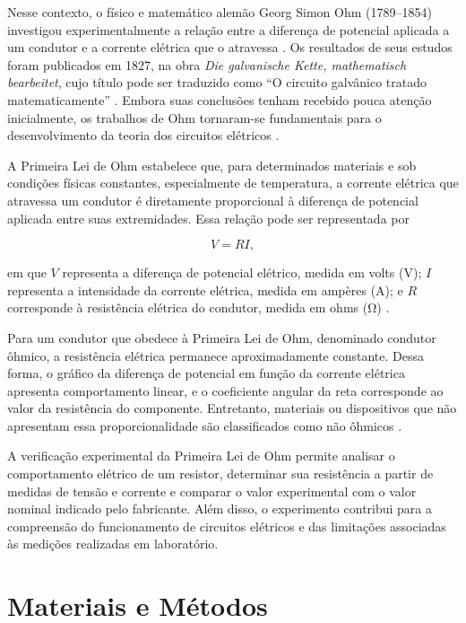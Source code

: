 \documentclass[a4paper,12pt]{article}
\begin{document}
Nesse contexto, o físico e matemático alemão Georg Simon Ohm (1789--1854) investigou experimentalmente a relação entre a diferença de potencial aplicada a um condutor e a corrente elétrica que o atravessa \parencite{mactutor_ohm}. Os resultados de seus estudos foram publicados em 1827, na obra \textit{Die galvanische Kette, mathematisch bearbeitet}, cujo título pode ser traduzido como ``O circuito galvânico tratado matematicamente'' \parencite{ohm1827}. Embora suas conclusões tenham recebido pouca atenção inicialmente, os trabalhos de Ohm tornaram-se fundamentais para o desenvolvimento da teoria dos circuitos elétricos \parencite{mactutor_ohm}.

A Primeira Lei de Ohm estabelece que, para determinados materiais e sob condições físicas constantes, especialmente de temperatura, a corrente elétrica que atravessa um condutor é diretamente proporcional à diferença de potencial aplicada entre suas extremidades. Essa relação pode ser representada por

\begin{equation}
V = R I,
\label{eq:primeira_lei_ohm}
\end{equation}

em que $V$ representa a diferença de potencial elétrico, medida em volts (\si{\volt}); $I$ representa a intensidade da corrente elétrica, medida em ampères (\si{\ampere}); e $R$ corresponde à resistência elétrica do condutor, medida em ohms (\si{\ohm}) \parencite[seção 9.4]{ling2016}.

Para um condutor que obedece à Primeira Lei de Ohm, denominado condutor ôhmico, a resistência elétrica permanece aproximadamente constante. Dessa forma, o gráfico da diferença de potencial em função da corrente elétrica apresenta comportamento linear, e o coeficiente angular da reta corresponde ao valor da resistência do componente. Entretanto, materiais ou dispositivos que não apresentam essa proporcionalidade são classificados como não ôhmicos \parencite[seção 9.4]{ling2016}.

A verificação experimental da Primeira Lei de Ohm permite analisar o comportamento elétrico de um resistor, determinar sua resistência a partir de medidas de tensão e corrente e comparar o valor experimental com o valor nominal indicado pelo fabricante. Além disso, o experimento contribui para a compreensão do funcionamento de circuitos elétricos e das limitações associadas às medições realizadas em laboratório.


\section{Materiais e Métodos}
\end{document}
